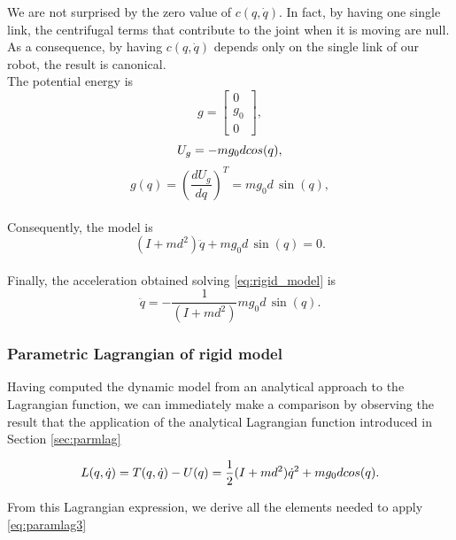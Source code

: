 \documentclass[a4paper]{article}
\begin{document}
We are not surprised by the zero value of $c(q,\dot{q})$. In fact, by having one single link, the centrifugal terms that contribute to the joint when it is moving are null. As a consequence, by having  $c(q,\dot{q})$ depends only on the single link of our robot, the result is canonical. \\

The potential energy is
\begin{equation}
    g=\begin{bmatrix}
        0 \\
        g_0 \\
        0
    \end{bmatrix},
\end{equation}
\begin{equation}
    U_g=-mg_0d\, \\cos(q),
\end{equation}
\begin{equation}
    g(q)=(\frac{dU_g}{dq})^T=mg_0d\, \sin(q),
\end{equation} \\

Consequently, the model is
\begin{equation}
\label{eq:rigid_model}
    (I+md^2)\ddot{q}+mg_0d\, \sin(q)=0.
\end{equation} \\

Finally, the acceleration obtained solving \eqref{eq:rigid_model} is
\begin{equation}
\label{eq:classical_rigid_acc}
    \ddot{q}=-\frac{1}{(I+md^2)}mg_0d\, \sin(q).
\end{equation}

\subsubsection{Parametric Lagrangian of rigid model}
Having computed the dynamic model from an analytical approach to the Lagrangian function, we can immediately make a comparison by observing the result that the application of the analytical Lagrangian function introduced in Section \ref{sec:parmlag}

\begin{equation}
    \label{eq:rig_eul_lag}
    L(q,\dot{q}) = T(q,\dot{q}) - U(q) = \frac{1}{2}(I+md^2)\dot{q}^2 + mg_0d\, \\cos(q) .
\end{equation}

From this Lagrangian expression, we derive all the elements needed to apply \eqref{eq:paramlag3}
\end{document}

